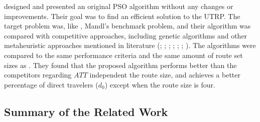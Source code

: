 \citet{kechagiopoulos14} designed and presented an original PSO algorithm without any changes or improvements. Their goal was to find an efficient solution to the UTRP. The target problem was, like \citet{nikolic14}, Mandl's benchmark problem, and their algorithm was compared with competitive approaches, including genetic algorithms and other metaheuristic approaches mentioned in literature (\citet{baaj91}; \citet{chakroborty02}; \citet{kidwai98}; \citet{fan10}; \citet{fan09-2}; \citet{zhang10}; \citet{chew12}). The algorithms were compared to the same performance criteria and the same amount of route set sizes as \citet{nikolic14}. They found that the proposed algorithm performs better than the competitors regarding $ATT$ independent the route size, and achieves a better percentage of direct travelers ($d_0$) except when the route size is four.  

\subsection{Summary of the Related Work}


